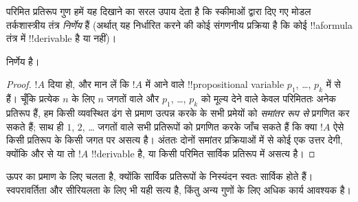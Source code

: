 \documentclass[../../../include/open-logic-section]{subfiles}
\begin{document}

परिमित प्रतिरूप गुण हमें यह दिखाने का सरल उपाय देता है कि स्कीमाओं द्वारा
दिए गए मोडल तर्कशास्त्रीय तंत्र \emph{निर्णेय} हैं (अर्थात् यह निर्धारित
करने की कोई संगणनीय प्रक्रिया है कि कोई !!a{formula} तंत्र में !!{derivable}
है या नहीं)।

\begin{thm}
   निर्णेय है।
\end{thm}

\begin{proof}
  $!A$ दिया हो, और मान लें कि $!A$ में आने वाले !!{propositional variable}
  $p_1$, \dots, $p_k$ में से हैं। चूँकि प्रत्येक $n$ के लिए $n$ जगतों
  वाले और $p_1$, \dots, $p_k$ को मूल्य देने वाले केवल परिमिततः अनेक
  प्रतिरूप हैं, हम किसी व्यवस्थित ढंग से प्रमाण उत्पन्न करके  के
  सभी प्रमेयों को \emph{समांतर रूप से} प्रगणित कर सकते हैं; साथ ही $1$,
  $2$, \dots{} जगतों वाले सभी प्रतिरूपों को प्रगणित करके जाँच सकते हैं कि
  क्या $!A$ ऐसे किसी प्रतिरूप के किसी जगत पर असत्य है। अंततः दोनों समांतर
  प्रक्रियाओं में से कोई एक उत्तर देगी, क्योंकि
   और  से या तो
  $!A$ !!{derivable} है, या किसी परिमित सार्विक प्रतिरूप में असत्य है।
\end{proof}

ऊपर का प्रमाण  के लिए चलता है, क्योंकि सार्विक प्रतिरूपों के
निस्यंदन स्वतः सार्विक होते हैं। स्वपरावर्तिता और सीरियलता के लिए भी यही
सत्य है, किंतु अन्य गुणों के लिए अधिक कार्य आवश्यक है।
\end{document}

